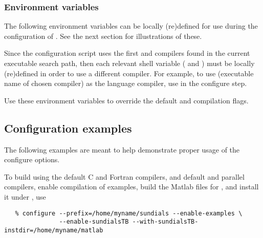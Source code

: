 \subsubsection*{Environment variables}


\noindent The following environment variables can be locally (re)defined for use 
during the configuration of {\sundials}. See the next section for
illustrations of these.

\begin{config}

\item {}

\item {}

  Since the configuration script uses the first {\C} and {\F} compilers found in
  the current executable search path, then each relevant shell variable (
  and ) must be locally (re)defined in order to use a different compiler. 
  For example, to use  (executable name of chosen compiler) as the {\C}
  language compiler, use  in the configure step.

\item {}

\item {}

  Use these environment variables to override the default {\C} and {\F}
  compilation flags.

\end{config}




\subsection{Configuration examples}

The following examples are meant to help demonstrate proper usage of the configure options.


To build {\sundials} using the default C and Fortran compilers,
and default  and  parallel compilers, enable compilation of examples,
build the Matlab  files for {\sundialsTB}, and install it under 
, use
\begin{verbatim}
   % configure --prefix=/home/myname/sundials --enable-examples \
               --enable-sundialsTB --with-sundialsTB-instdir=/home/myname/matlab
\end{verbatim}


